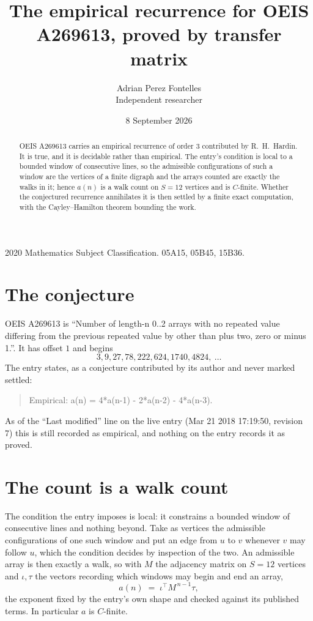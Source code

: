 \documentclass[11pt,a4paper]{article}
\title{The empirical recurrence for OEIS A269613, proved by transfer matrix}
\author{Adrian Perez Fontelles\\ \small Independent researcher}
\date{8 September 2026}
\theoremstyle{plain}
\theoremstyle{definition}
\begin{document}
\maketitle

\begin{abstract}
OEIS A269613 carries an empirical recurrence of order $3$ contributed by R.~H.~Hardin. It is
true, and it is decidable rather than empirical. The entry's condition is local to a bounded window of consecutive lines, so
the admissible configurations of such a window are the vertices of a finite digraph and the
arrays counted are exactly the walks in it; hence $a(n)$ is a walk count on $S=12$ vertices
and is $C$-finite. Whether the conjectured recurrence annihilates it is then settled by a
finite exact computation, with the Cayley--Hamilton theorem bounding the work.
\end{abstract}

\noindent\small 2020 Mathematics Subject Classification. 05A15, 05B45, 15B36.\normalsize

\section{The conjecture}

OEIS A269613 is ``Number of length-n 0..2 arrays with no repeated value differing from the previous repeated value by other than plus two, zero or minus 1.''. It has offset $1$ and begins
\[
3, 9, 27, 78, 222, 624, 1740, 4824,\ \dots
\]
The entry states, as a conjecture contributed by its author and never marked settled:
\begin{quote}
Empirical: a(n) = 4*a(n-1) - 2*a(n-2) - 4*a(n-3).
\end{quote}
As of the ``Last modified'' line on the live entry (Mar 21 2018 17:19:50, revision 7) this is still
recorded as empirical, and nothing on the entry records it as proved.

\section{The count is a walk count}

The condition the entry imposes is local: it constrains a bounded window of consecutive lines and nothing beyond. Take as
vertices the admissible configurations of one such window and put an edge from $u$ to $v$
whenever $v$ may follow $u$, which the condition decides by inspection of the two. An
admissible array is then exactly a walk, so with $M$ the adjacency matrix on $S=12$ vertices
and $\iota,\tau$ the vectors recording which windows may begin and end an array,
\[
a(n)\;=\;\iota^{\!\top}M^{\,n-1}\tau ,
\]
the exponent fixed by the entry's own shape and checked against its published terms. In
particular $a$ is $C$-finite.
\end{document}
